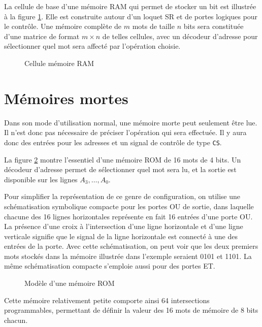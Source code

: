\documentclass[letter, oneside]{book}
\begin{document}
\begin{enumerate}
La cellule de base d'une mémoire RAM qui permet de stocker un bit est
illustrée à la figure \ref{fig:org6d480e0}. Elle est construite autour d'un
loquet SR et de portes logiques pour le contrôle. Une mémoire complète
de \(m\) mots de taille \(n\) bits sera constituée d'une matrice de
format \(m \times n\) de telles cellules, avec un décodeur d'adresse
pour sélectionner quel mot sera affecté par l'opération choisie.

\begin{figure}[htbp]
\centering

\caption{\label{fig:org6d480e0}Cellule mémoire RAM}
\end{figure}
\end{enumerate}


\section{Mémoires mortes}
\label{sec:org12b1287}

Dans son mode d'utilisation normal, une mémoire morte peut seulement
être lue. Il n'est donc pas nécessaire de préciser l'opération qui
sera effectuée. Il y aura donc des entrées pour les adresses et un
signal de contrôle de type \texttt{CS}.

La figure \ref{fig:orge351c9a} montre l'essentiel d'une mémoire ROM de
16 mots de 4 bits. Un décodeur d'adresse permet de sélectionner quel
mot sera lu, et la sortie est disponible sur les lignes \(A_3, \ldots,
A_0\). 

Pour simplifier la représentation de ce genre de configuration, on
utilise une schématisation symbolique compacte pour les portes OU de
sortie, dans laquelle chacune des 16 lignes horizontales représente en
fait 16 entrées d'une porte OU. La présence d'une croix à
l'intersection d'une ligne horizontale et d'une ligne verticale
signifie que le signal de la ligne horizontale est connecté à une des
entrées de la porte.  Avec cette schématisation, on peut voir que les
deux premiers mots stockés dans la mémoire illustrée dans l'exemple
seraient 0101 et 1101. La même schématisation compacte s'emploie aussi
pour des portes ET.


\begin{figure}[htbp]
\centering

\caption{\label{fig:orge351c9a}Modèle d'une mémoire ROM}
\end{figure}

Cette mémoire relativement petite comporte ainsi 64 intersections
programmables, permettant de définir la valeur des 16 mots de mémoire
de 8 bits chacun.
\end{document}

